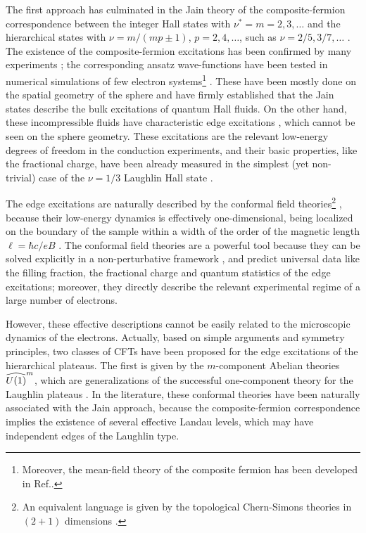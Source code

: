 The first approach has culminated in the Jain
theory of the composite-fermion correspondence between
the integer Hall states with $\nu^*=m=2,3,\dots$ and the hierarchical states
with $\nu=m/(mp \pm 1)$, $p=2,4,\dots$, such as 
$\nu=2/5,3/7,\dots$ \cite{jain}.
The existence of the composite-fermion excitations has been 
confirmed by many experiments \cite{cfexp};
the corresponding ansatz wave-functions
have been tested in numerical simulations of few electron systems\footnote{
Moreover, the mean-field theory of the composite fermion has been 
developed in Ref.\cite{mfth}.} \cite{jain}\cite{jj}\cite{jaka}.
These have been mostly done on the spatial geometry of the 
sphere and have firmly established that the Jain states describe
the bulk excitations of quantum Hall fluids. 
On the other hand, these incompressible fluids have 
characteristic edge excitations \cite{wen}, 
which cannot be seen on the sphere geometry. 
These excitations are the relevant low-energy degrees of freedom in the 
conduction experiments, and their basic properties,
like the fractional charge, have been already measured
in the simplest (yet non-trivial) case of the $\nu=1/3$ Laughlin Hall state
\cite{tdom} \cite{mill} \cite{shot}.

The edge excitations are naturally described by 
the conformal field theories\footnote{
An equivalent language is given by the topological Chern-Simons
theories in $(2+1)$ dimensions \cite{juerg}.}
\cite{gins}, because their 
low-energy dynamics is effectively one-dimensional,
being localized on the boundary of the sample  
within a width of the order of the magnetic length $\ell=\hbar c/eB$
\cite{stone}\cite{cdtz1}.
The conformal field theories are a powerful tool because they can be solved 
explicitly in a non-perturbative framework \cite{gins}, and predict 
universal data like the filling fraction, the fractional charge
and quantum statistics of the edge excitations;
moreover, they directly describe the relevant experimental
regime of a large number of electrons.

However, these effective descriptions cannot be easily related
to the microscopic dynamics of the electrons.
Actually, based on simple arguments and symmetry principles,
two classes of CFTs have been proposed for the edge 
excitations of the hierarchical plateaus.
The first is given by the $m$-component Abelian theories $\u1^m$, which 
are generalizations of the successful one-component theory 
for the Laughlin plateaus \cite{read}\cite{juerg}\cite{wen}.
In the literature, these conformal theories have been naturally associated 
with the Jain approach, because the composite-fermion correspondence 
implies the existence of several effective Landau levels, which may
have independent edges of the Laughlin type.


